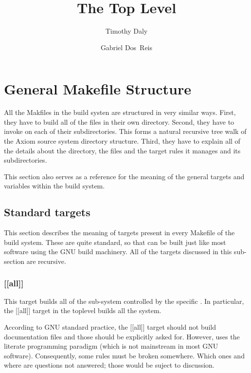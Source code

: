 \documentclass{article}
\title{The Top Level \File{Makefile}}
\author{Timothy Daly \and Gabriel Dos~Reis}
\begin{document}
\maketitle

\begin{abstract}
\end{abstract}
\eject

\tableofcontents
\eject

\section{General Makefile Structure}
\label{sec:general-structure}

All the Makfiles in the  build systen are structured in very
similar ways.  First, they have to build all of the files
in their own directory. Second, they have to invoke  on each
of their subdirectories.  This forms a natural recursive tree walk of
the Axiom source system directory structure. Third, they have to
explain all of the details about the directory, the files and the
target rules it manages and its subdirectories.

This section also serves as a reference for the meaning of the
general targets and variables within the  build system.

\subsection{Standard targets}
\label{sec:general-structure:std-targets}

This section describes the meaning of  targets present in every
Makefile of the  build system.  These are quite standard,
so that  can be built just like most software using the
GNU build machinery.  All of the targets discussed in this sub-section
are recursive.

\subsubsection{[[all]]}
\label{sec:general-structure:std-targets:all}

This target builds all of the  sub-system controlled by the
specific .  In particular, the [[all]] target in the
toplevel  builds all the  system.

According to GNU standard practice, the [[all]] target should not
build documentation files and those should be explicitly asked for.
However,  uses the literate programming paradigm (which is
not mainstream in most GNU software).  Consequently, some rules must
be broken somewhere.  Which ones and where are questions not answered;
those would be suject to discussion.
\end{document}
